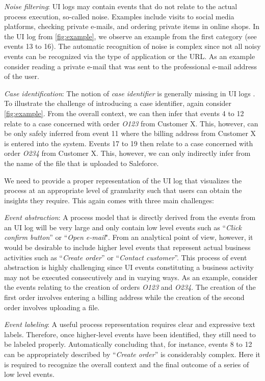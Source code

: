 \noindent \textit{Noise filtering}: UI logs may contain events that do not relate to the actual process execution, so-called noise. Examples include visits to social media platforms, checking private e-mails, and ordering private items in online shops. In the UI log from \autoref{fig:example}, we observe an example from the first category (see events 13 to 16). The automatic recognition of noise is complex since not all noisy events can be recognized via the type of application or the URL. As an example consider reading a private e-mail that was sent to the professional e-mail address of the user.

\noindent \textit{Case identification}: The notion of \textit{case identifier} is generally missing in UI logs \cite{leno2021robotic}. To illustrate the challenge of introducing a case identifier, again consider \autoref{fig:example}. From the overall context, we can then infer that events 4 to 12 relate to a case concerned with order \textit{O123} from Customer X. This, however, can be only safely inferred from event 11 where the billing address from Customer X is entered into the system. Events 17 to 19 then relate to a case concerned with order \textit{O234} from Customer X. This, however, we can only indirectly infer from the name of the file that is uploaded to Saleforce. 

 We need to provide a proper representation of the UI log that visualizes the process at an appropriate level of granularity such that users can obtain the insights they require. This again comes with three main challenges: 

\noindent \textit{Event abstraction}: A process model that is directly derived from the events from an UI log will be very large and only contain low level events such as ``\textit{Click confirm button}'' or ``\textit{Open e-mail}". From an analytical point of view, however,  it would be desirable to include higher level events that represent actual business activities such as ``\textit{Create order}'' or ``\textit{Contact customer}''. This process of event abstraction is highly challenging since UI events constituting a business activity may not be executed consecutively and in varying ways. As an example, consider the events relating to the creation of orders \textit{O123} and \textit{O234}. The creation of the first order involves entering a billing address while the creation of the second order involves uploading a file. 

\noindent \textit{Event labeling}: A useful process representation requires clear and expressive text labels. Therefore, once higher-level events have been identified, they still need to be labeled properly. Automatically concluding that, for instance, events 8 to 12 can be appropriately described by ``\textit{Create order}'' is considerably complex. Here it is required to recognize the overall context and the final outcome of a series of low level events.  
 
